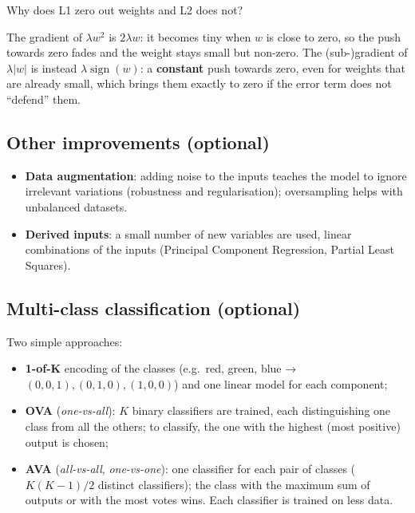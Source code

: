 \begin{boxtip}{Why does L1 zero out weights and L2 does not?}

The gradient of \(\lambda w^2\) is \(2\lambda w\): it becomes tiny when
\(w\) is close to zero, so the push towards zero fades and the weight
stays small but non-zero. The (sub-)gradient of \(\lambda|w|\) is
instead \(\lambda\operatorname{sign}(w)\): a \textbf{constant} push
towards zero, even for weights that are already small, which brings
them exactly to zero if the error term does not ``defend'' them.

\end{boxtip}

\subsection{Other improvements
(optional)}\label{altri-miglioramenti-opzionali}

\begin{itemize}
\tightlist
\item
  \textbf{Data augmentation}: adding noise to the inputs teaches the
  model to ignore irrelevant variations (robustness and
  regularisation); oversampling helps with unbalanced datasets.
\item
  \textbf{Derived inputs}: a small number of new variables are used,
  linear combinations of the inputs (Principal Component Regression,
  Partial Least Squares).
\end{itemize}

\subsection{Multi-class classification
(optional)}\label{classificazione-multi-classe-opzionale}

Two simple approaches:

\begin{itemize}
\tightlist
\item
  \textbf{1-of-K} encoding of the classes (e.g.\ red, green, blue →
  \((0,0,1), (0,1,0), (1,0,0)\)) and one linear model for each
  component;
\item
  \textbf{OVA} (\emph{one-vs-all}): \(K\) binary classifiers are
  trained, each distinguishing one class from all the others; to
  classify, the one with the highest (most positive) output is chosen;
\item
  \textbf{AVA} (\emph{all-vs-all}, \emph{one-vs-one}): one classifier
  for each pair of classes (\(K(K-1)/2\) distinct classifiers); the
  class with the maximum sum of outputs or with the most votes wins.
  Each classifier is trained on less data.
\end{itemize}

